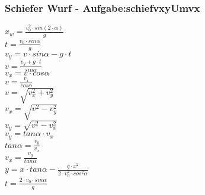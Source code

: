 \subsubsection{Schiefer Wurf  - Aufgabe:schiefvxyUmvx} 
\begin{minipage}{0.45\textwidth} 
$ x_{w}  = \frac{v_{0} ^{2} \cdot sin(2\cdot \alpha )}{       g} $\\ 
$ t =\frac{v_{0} \cdot sin \alpha }{  g} $\\ 
$ v_{y}  =  v\cdot sin\alpha - g\cdot t $\\ 
$ v= \frac{ v_{y} +g\cdot t}{ sin\alpha } $\\ 
$ v_{x}  = v\cdot  cos\alpha $\\ 
$ v= \frac{ v_{x} }{ cos\alpha } $\\ 
$ v= \sqrt{ v_{x} ^{2} + v_{y} ^{2} } $\\ 
$ v_{x} = \sqrt{ v^{2}  - v_{y} ^{2} } $\\ 
$ v_{y} = \sqrt{ v^{2}  - v_{x} ^{2} } $\\ 
$ v_{y} = tan \alpha \cdot  v_{x} $\\ 
$ tan \alpha = \frac{v_{y} }{v_{x} } $\\ 
$ v_{x} = \frac{v_{y} }{tan \alpha } $\\ 
$ y = x\cdot tan \alpha  - \frac{   g\cdot x^{2} }{2\cdot v^{2} _{0} \cdot cos ^{2}\alpha } $\\ 
$ t =\frac{2\cdot v_{0} \cdot sin \alpha }{ g} $\\ 
\end{minipage} 
\begin{minipage}{0.45\textwidth} 
 
\end{minipage} 
